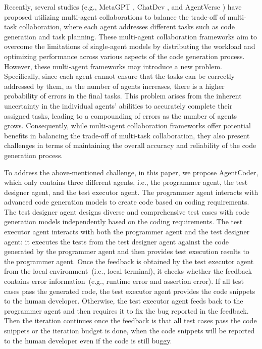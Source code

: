 \documentclass[manuscript,screen,review]{acmart}
\newcommand{\xxx}{AgentCoder\xspace}
\begin{document}
{\color{red} 
Recently, several studies (e.g., MetaGPT \cite{hong2023metagpt}, ChatDev \cite{qian2023communicative}, and AgentVerse \cite{Chen2023AgentVerseFM}) have proposed utilizing multi-agent collaborations to balance the trade-off of multi-task collaboration, where each agent addresses different tasks such as code generation and task planning. These multi-agent collaboration frameworks aim to overcome the limitations of single-agent models by distributing the workload and optimizing performance across various aspects of the code generation process. However, these multi-agent frameworks may introduce a new problem. Specifically, since each agent cannot ensure that the tasks can be correctly addressed by them, as the number of agents increases, there is a higher probability of errors in the final tasks. This problem arises from the inherent uncertainty in the individual agents' abilities to accurately complete their assigned tasks, leading to a compounding of errors as the number of agents grows. Consequently, while multi-agent collaboration frameworks offer potential benefits in balancing the trade-off of multi-task collaboration, they also present challenges in terms of maintaining the overall accuracy and reliability of the code generation process.}

To address the above-mentioned challenge, in this paper, we propose \xxx, which only contains three different agents, i.e., the programmer agent, the test designer agent, and the test executor agent. The programmer agent interacts with advanced code generation models to create code based on coding requirements. The test designer agent designs diverse and comprehensive test cases with code generation models independently based on the coding requirements. The test executor agent interacts with both the programmer agent and the test designer agent: it executes the tests from the test designer agent against the code generated by the programmer agent and then provides test execution results to the programmer agent. Once the feedback is obtained by the test executor agent from the local environment~(i.e., local terminal), it checks whether the feedback contains error information~(e.g., runtime error and assertion error). If all test cases pass the generated code, the test executor agent provides the code snippets to the human developer. Otherwise, the test executor agent feeds back to the programmer agent and then requires it to fix the bug reported in the feedback. Then the iteration continues once the feedback is that all test cases pass the code snippets or the iteration budget is done, when the code snippets will be reported to the human developer even if the code is still buggy.
\end{document}

